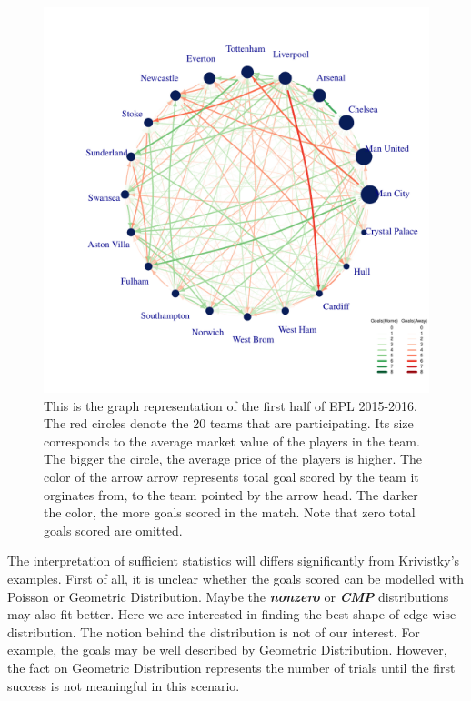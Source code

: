 \documentclass[12pt,a4paper,twoside,openany]{book}\usepackage[]{graphicx}\usepackage[]{color}
\makeatletter
\def\maxwidth{ %
  \ifdim\Gin@nat@width>\linewidth
    \linewidth
  \else
    \Gin@nat@width
  \fi
}
\newenvironment{knitrout}{}{} %
\newcommand{\BI}[1]{\textit{\textbf{#1}}}
\makeatother
\begin{document}
\begin{figure}[H]
\begin{knitrout}
\color{fgcolor}

{\centering \includegraphics[width=\maxwidth]{figure/unnamed-chunk-5-1} 

}



\end{knitrout}
\caption [Graph Representation of a Football League]{This is the graph representation of the first half of EPL 2015-2016. The red circles denote the 20 teams that are participating. Its size corresponds to the average market value of the players in the team. The bigger the circle, the average price of the players is higher. The color of the arrow arrow represents total goal scored by the team it orginates from, to the team pointed by the arrow head. The darker the color, the more goals scored in the match. Note that zero total goals scored are omitted.}
\label{fig:EPL2015}
\end{figure}

The interpretation of sufficient statistics will differs significantly from Krivistky's examples. 
First of all, it is unclear whether the goals scored can be modelled with Poisson or Geometric Distribution.
Maybe the \BI{nonzero} or \BI{CMP} distributions may also fit better. 
Here we are interested in finding the best shape of edge-wise distribution.
The notion behind the distribution is not of our interest.
For example, the goals may be well described by Geometric Distribution. 
However, the fact on Geometric Distribution represents the number of trials until the first success is not meaningful in this scenario.
\end{document}
